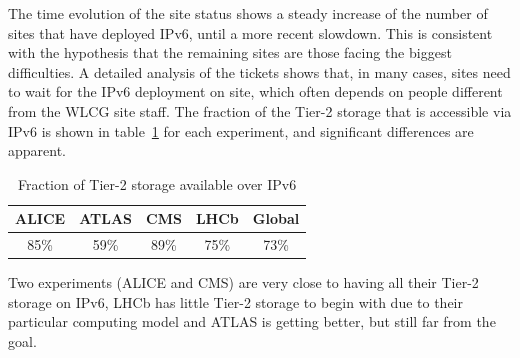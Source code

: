 The time evolution of the site status shows a steady increase of the
number of sites that have deployed IPv6, until a more recent
slowdown. This is consistent with the hypothesis that the remaining
sites are those facing the biggest difficulties. A detailed analysis
of the tickets shows that, in many cases, sites need to wait for the
IPv6 deployment on site, which often depends on people different from
the WLCG site staff. The fraction of the Tier-2 storage that is
accessible via IPv6 is shown in table~\ref{tab:t2stor} for each experiment, and significant differences are apparent.
\begin{table}[h]
\centering
\caption{Fraction of Tier-2 storage available over IPv6}
\label{tab:t2stor}
\begin{tabular}{ccccc}
\hline
ALICE & ATLAS & CMS & LHCb & Global \\\hline
85\% & 59\% & 89\% & 75\% & 73\% \\\hline
\end{tabular}
\end{table}
Two experiments (ALICE and CMS) are very close to having all their
Tier-2 storage on IPv6, LHCb has little Tier-2 storage to begin with
due to their particular computing model and ATLAS is getting better,
but still far from the goal.

